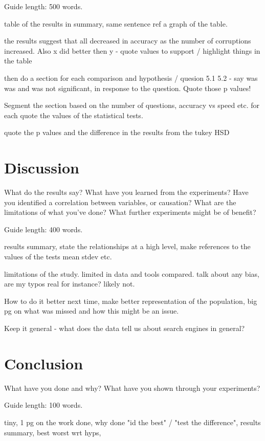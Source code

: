 \documentclass{csfourzero}
\begin{document}
Guide length: 500 words.

table of the results in summary, same sentence ref a graph of the table.

the results suggest that all decreased in accuracy as the number of corruptions increased. Also x did better then y - quote values to support / highlight things in the table

then do a section for each comparison and hypothesis / quesion 5.1 5.2 - say was was and was not significant, in response to the question. Quote those p values!

Segment the section based on the number of questions, accuracy vs speed etc. for each quote the values of the statistical tests.

quote the p values and the difference in the results from the tukey HSD

\section{Discussion}
\label{sec:discuss}

What do the results say? What have you learned from the
experiments? Have you identified a correlation between variables, or
causation? What are the limitations of what you've done? What further
experiments might be of benefit?

Guide length: 400 words.

results summary, state the relationships at a high level, make references to the values of the tests mean stdev etc.

limitations of the study. limited in data and tools compared. talk about any bias, are my typos real for instance? likely not.

How to do it better next time, make better representation of the population, big pg on what was missed and how this might be an issue.

Keep it general - what does the data tell us about search engines in general?

\section{Conclusion}
\label{sec:conc}

What have you done and why? What have you shown through your
experiments?

Guide length: 100 words.

tiny, 1 pg on the work done, why done "id the best" / "test the difference", results summary, best worst wrt hyps,
\end{document}
